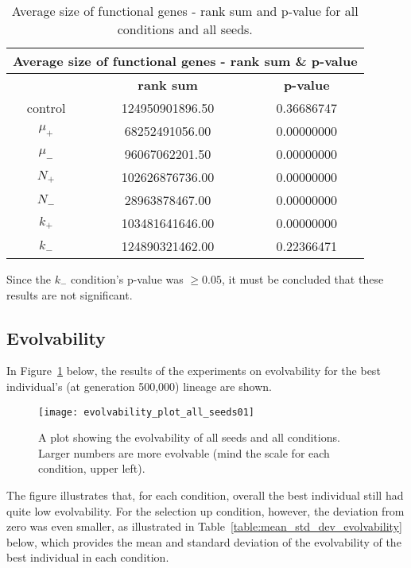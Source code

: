 \begin{table}[H]
	\begin{tabular}{|c|c|c|}
		\hline
		\multicolumn{3}{c}{\Large \textbf{Average size of functional genes - rank sum \& p-value}} \\
		\hline
		& \textbf{rank sum} & \textbf{p-value} \\
		\hline
		control & 124950901896.50 & 0.36686747 \\ 
		\hline
		$\mu_+$ & 68252491056.00 & 0.00000000 \\ 
		\hline
		$\mu_-$ & 96067062201.50 & 0.00000000 \\ 
		\hline
		$N_+$ & 102626876736.00 & 0.00000000 \\ 
		\hline
		$N_-$ & 28963878467.00 & 0.00000000 \\ 
		\hline
		$k_+$ & 103481641646.00 & 0.00000000 \\ 
		\hline
		$k_-$ & 124890321462.00 & 0.22366471 \\ 
		\hline
	\end{tabular}
	\caption[Average size of functional genes - rank sum and p-value]{Average size of functional genes - rank sum and p-value for all conditions and all seeds.}
	\label{table:avg_size_of_functional_genes_rank_sum_and_p-value}
\end{table}
Since the $k_-$ condition's p-value was $\geq0.05$, it must be concluded that these results are not significant. 

\subsection{Evolvability}\label{res:evolvability}
In Figure~\ref{fig:evolvability_all_seeds} below, the results of the experiments on evolvability for the best individual's (at generation 500,000) lineage are shown. 
\begin{figure}[H]
	\centering
	\texttt{[image: evolvability\_plot\_all\_seeds01]}
	\caption[Evolvability plot, all seed]{A plot showing the evolvability of all seeds and all conditions. Larger numbers are more evolvable (mind the scale for each condition, upper left).}
	\label{fig:evolvability_all_seeds}	
\end{figure}
The figure illustrates that, for each condition, overall the best individual still had quite low evolvability. For the selection up condition, however, the deviation from zero was even smaller, as illustrated in Table~\ref{table:mean_std_dev_evolvability} below, which provides the mean and standard deviation of the evolvability of the best individual in each condition. 

